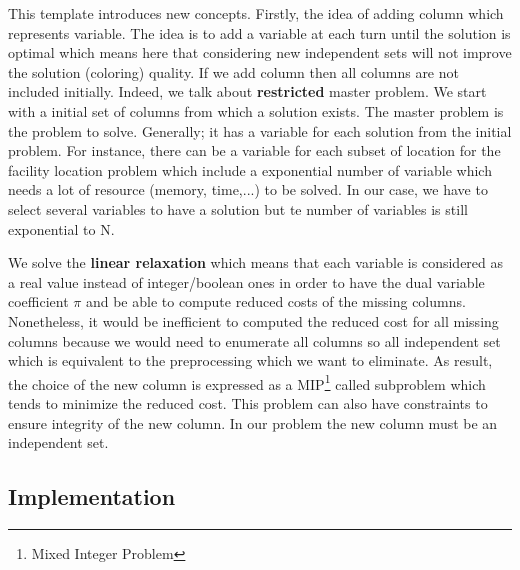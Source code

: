 This template introduces new concepts. Firstly, the idea of adding column which represents variable. The idea is to add a variable at each turn until the solution is optimal which means here that considering new independent sets will not improve the solution (coloring) quality. If we add column then all columns are not included initially. Indeed, we talk about \textbf{restricted} master problem. We start with a initial set of columns from which a solution exists. The master problem is the problem to solve. Generally; it has a variable for each solution from the initial problem. For instance, there can be a variable for each subset of location for the facility location problem which include a exponential number of variable which needs a lot of resource (memory, time,...) to be solved. In our case, we have to select several variables to have a solution but te number of variables is still exponential to N.

We solve the \textbf{linear relaxation} which means that each variable is considered as a real value instead of integer/boolean ones in order to have the dual variable coefficient $\pi$ and be able to compute reduced costs of the missing columns. Nonetheless, it would be inefficient to computed the reduced cost for all missing columns because we would need to enumerate all columns so all independent set which is equivalent to the preprocessing which we want to eliminate. As result, the choice of the new column is expressed as a MIP\footnote{Mixed Integer Problem} called subproblem which tends to minimize the reduced cost. This problem can also have constraints to ensure integrity of the new column. In our problem the new column must be an independent set.\\

\subsection{Implementation}

